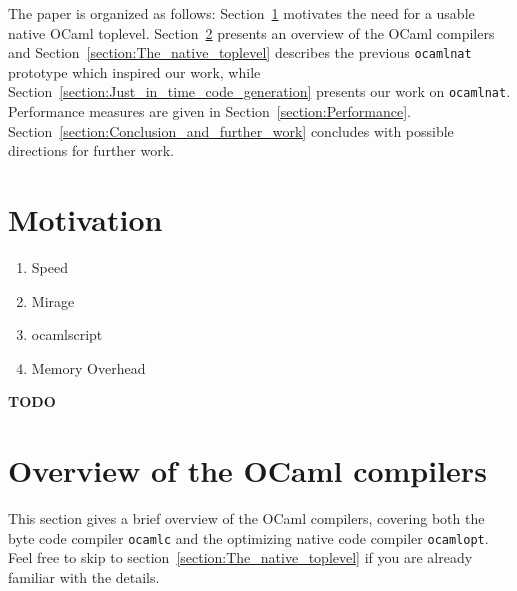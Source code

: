 \documentclass[10pt,a4paper,draft,twocolumn]{article}
\begin{document}
The paper is organized as follows: Section~\ref{section:Motivation} motivates the need for a
usable native OCaml toplevel. Section~\ref{section:Overview_of_the_OCaml_compilers} presents
an overview of the OCaml compilers and Section~\ref{section:The_native_toplevel} describes the
previous \texttt{ocamlnat} prototype which inspired our work, while
Section~\ref{section:Just_in_time_code_generation} presents our work on \texttt{ocamlnat}.
Performance measures are given in Section~\ref{section:Performance}.
Section~\ref{section:Conclusion_and_further_work} concludes with possible directions for
further work.


\section{Motivation} \label{section:Motivation}

\begin{enumerate}
\item Speed
\item Mirage \cite{Mirage11,Madhavapeddy10,Madhavapeddy10hotcloud}
\item ocamlscript \cite{ocamlscript11}
\item Memory Overhead
\end{enumerate}

\textbf{TODO}


\section{Overview of the OCaml compilers} \label{section:Overview_of_the_OCaml_compilers}

This section gives a brief overview of the OCaml compilers, covering both the byte code compiler
\texttt{ocamlc} and the optimizing native code compiler \texttt{ocamlopt}.
Feel free to skip to section~\ref{section:The_native_toplevel} if you are already familiar with the details.
\end{document}
